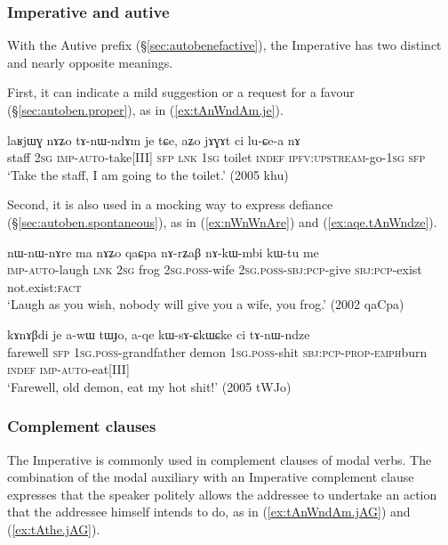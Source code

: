 \subsubsection{Imperative and autive} \label{sec:imp.autive}
With the Autive prefix (§\ref{sec:autobenefactive}), the Imperative has two distinct and nearly opposite meanings. 

First, it can indicate a mild suggestion or a request for a favour (§\ref{sec:autoben.proper}), as in (\ref{ex:tAnWndAm.je}).

\begin{exe}
\ex \label{ex:tAnWndAm.je}
\gll laʁjɯɣ nɤʑo tɤ-nɯ-ndɤm je tɕe, aʑo jɤɣɤt ci lu-ɕe-a nɤ \\
staff \textsc{2sg} \textsc{imp}-\textsc{auto}-take[III] \textsc{sfp} \textsc{lnk} \textsc{1sg} toilet \textsc{indef} \textsc{ipfv}:\textsc{upstream}-go-\textsc{1sg} \textsc{sfp} \\
\glt `Take the staff, I am going to the toilet.' (2005 khu)
\end{exe}

Second, it is also used in a mocking way to express defiance (§\ref{sec:autoben.spontaneous}), as in (\ref{ex:nWnWnAre}) and (\ref{ex:aqe.tAnWndze}).

\begin{exe}
\ex  \label{ex:nWnWnAre}
\gll  nɯ-nɯ-nɤre ma nɤʑo qaɕpa nɤ-rʑaβ nɤ-kɯ-mbi kɯ-tu me   \\
\textsc{imp}-\textsc{auto}-laugh \textsc{lnk} \textsc{2sg} frog \textsc{2sg}.\textsc{poss}-wife \textsc{2sg}.\textsc{poss}-\textsc{sbj}:\textsc{pcp}-give \textsc{sbj}:\textsc{pcp}-exist not.exist:\textsc{fact} \\
\glt `Laugh as you wish, nobody will give you a wife, you frog.'   (2002 qaCpa)
\end{exe} 

\begin{exe}
\ex  \label{ex:aqe.tAnWndze}
\gll kɤnɤβdi je a-wɯ tɯɟo, a-qe kɯ-sɤ-ɕkɯ\redp{}ɕke ci tɤ-nɯ-ndze \\
farewell \textsc{sfp} \textsc{1sg}.\textsc{poss}-grandfather demon \textsc{1sg}.\textsc{poss}-shit \textsc{sbj}:\textsc{pcp}-\textsc{prop}-\textsc{emph}\redp{}burn \textsc{indef} \textsc{imp}-\textsc{auto}-eat[III] \\
\glt `Farewell, old demon, eat my hot shit!' (2005 tWJo)
\end{exe}

\subsubsection{Complement clauses} \label{sec:imp.compl}
The Imperative is commonly used in complement clauses of modal verbs. The combination of the modal auxiliary  with an Imperative complement clause expresses that the speaker politely allows the addressee to undertake an action that the addressee himself intends to do, as in (\ref{ex:tAnWndAm.jAG}) and (\ref{ex:tAthe.jAG}).

